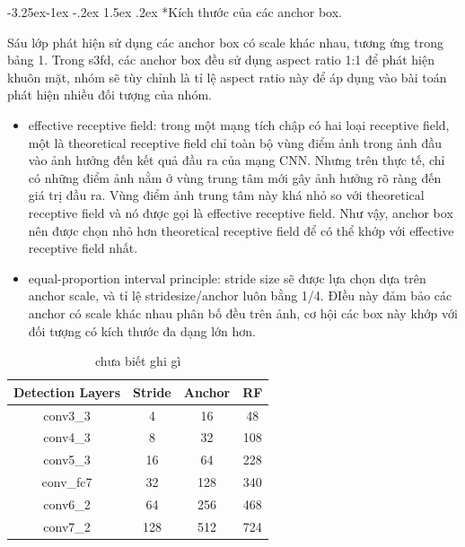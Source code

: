 \documentclass[a4paper]{report}
\makeatletter
\newcounter {subsubsubsection}[subsubsection]
\newcommand\subsubsubsection{\@startsection{subsubsubsection}{4}{\z@}%
                                     {-3.25ex\@plus -1ex \@minus -.2ex}%
                                     {1.5ex \@plus .2ex}%
                                     {\normalfont\normalsize\bfseries}}
\makeatother
\begin{document}
\subsubsubsection*{Kích thước của các anchor box.}

Sáu lớp phát hiện sử dụng các anchor box có scale khác nhau, tương ứng trong bảng 1. Trong s3fd, các anchor box đều sử dụng aspect ratio 1:1 để phát hiện khuôn mặt, nhóm sẽ tùy chỉnh là tỉ lệ aspect ratio này để áp dụng vào bài toán phát hiện nhiều đối tượng của nhóm. 
\begin{itemize}
\item effective receptive field: trong một mạng tích chập có hai loại receptive field, một là theoretical receptive field chỉ toàn bộ vùng điểm ảnh trong ảnh đầu vào ảnh hưởng đến kết quả đầu ra của mạng CNN. Nhưng trên thực tế, chỉ có những điểm ảnh nằm ở vùng trung tâm mới gây ảnh hưởng rõ ràng đến giá trị đầu ra. Vùng điểm ảnh trung tâm này khá nhỏ so với theoretical receptive field và nó được gọi là effective receptive field. Như vậy, anchor box nên được chọn nhỏ hơn theoretical receptive field để có thể khớp với effective receptive field nhất. 
\item equal-proportion interval principle: stride size sẽ được lựa chọn dựa trên anchor scale, và tỉ lệ stridesize/anchor luôn bằng 1/4. ĐIều này đảm bảo các anchor có scale khác nhau phân bố đều trên ảnh, cơ hội các box này khớp với đối tượng có kích thước đa dạng lớn hơn.
\end{itemize}

\begin{table}[h!]
	\centering
	\caption{chưa biết ghi gì}
	\begin{tabular}{|cccc|}
		\hline
		Detection Layers & Stride & Anchor & RF \\ \hline
		conv3\_3 & 4 &16& 48 \\ 
		conv4\_3  & 8 &32& 108 \\
		conv5\_3 &16 &64 &228 \\
		conv\_fc7 &32 &128 &340 \\
		conv6\_2 &64 &256& 468 \\
		conv7\_2 &128& 512& 724 \\ \hline
	\end{tabular}
\end{table}
\end{document}
